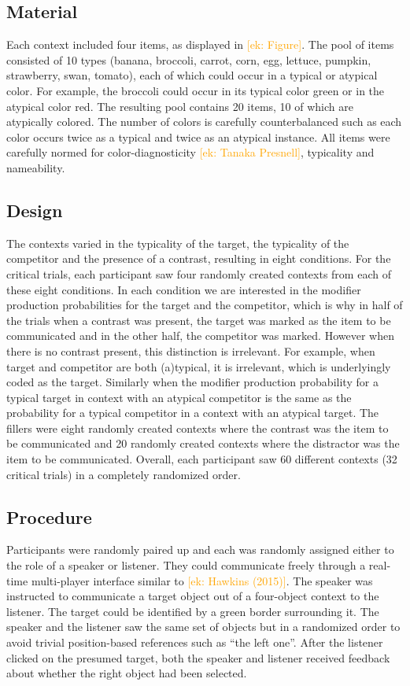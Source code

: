 \documentclass[10pt,letterpaper]{article}
\newcommand{\ek}[1]{\textcolor{Orange}{[ek: #1]}}
\begin{document}
\subsection{Material} \label{Material}
Each context included four items, as displayed in \ek{Figure}. The pool of items consisted of 10 types (banana, broccoli, carrot, corn, egg, lettuce, pumpkin, strawberry, swan, tomato), each of which could occur in a typical or atypical color. For example, the broccoli could occur in its typical color green or in the atypical color red. The resulting pool contains 20 items, 10 of which are atypically colored. The number of colors is carefully counterbalanced such as each color occurs twice as a typical and twice as an atypical instance. All items were carefully normed for color-diagnosticity \ek{Tanaka Presnell}, typicality and nameability.


\subsection{Design}
The contexts varied in the typicality of the target, the typicality of the competitor and the presence of a contrast, resulting in eight conditions. For the critical trials, each participant saw four randomly created contexts from each of these eight conditions. In each condition we are interested in the modifier production probabilities for the target and the competitor, which is why in half of the trials when a contrast was present, the target was marked as the item to be communicated and in the other half, the competitor was marked. However when there is no contrast present, this distinction is irrelevant. For example, when target and competitor are both (a)typical, it is irrelevant, which is underlyingly coded as the target. Similarly when the modifier production probability for a typical target in context with an atypical competitor is the same as the probability for a typical competitor in a context with an atypical target. 
The fillers were eight randomly created contexts where the contrast was the item to be communicated and 20 randomly created contexts where the distractor was the item to be communicated.
Overall, each participant saw 60 different contexts (32 critical trials) in a completely randomized order.


\subsection{Procedure}
Participants were randomly paired up and each was randomly assigned either to the role of a speaker or listener. They could communicate freely through a real-time multi-player interface similar to \ek{Hawkins (2015)}. The speaker was instructed to communicate a target object out of a four-object context to the listener. The target could be identified by a green border surrounding it. The speaker and the listener saw the same set of objects but in a randomized order to avoid trivial position-based references such as ``the left one''. After the listener clicked on the presumed target, both the speaker and listener received feedback about whether the right object had been selected.
\end{document}
